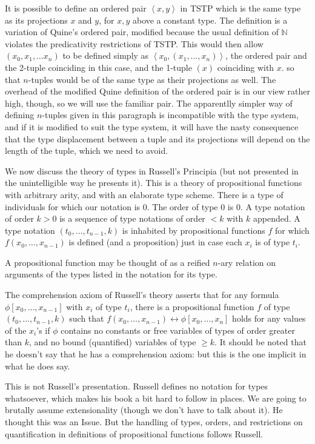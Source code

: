 \documentclass[12pt]{article}
\begin{document}
It is possible to define an ordered pair $\left<x,y\right>$ in TSTP which is the same type as its projections
$x$ and $y$, for $x,y$ above a constant type.  The definition is a variation of Quine's ordered pair, modified
because the usual definition of $\mathbb N$ violates the predicativity restrictions of TSTP.  This would then allow
$(x_0,x_1,\ldots x_n)$ to be defined simply as $\left<x_0,(x_1,\ldots,x_n)\right>$, the ordered pair and the 2-tuple coinciding in this case, and the 1-tuple $(x)$ coinciding with $x$. so that $n$-tuples would be of the same type as their projections as well.  The overhead of the modified Quine definition of the ordered pair is in our view rather high, though, so we will use the familiar pair.  The apparentlly simpler way of defining $n$-tuples given in this paragraph is
incompatible with the type system, and if it is modified to suit the type system, it will have the nasty consequence
that the type displacement between a tuple and its projections will depend on the length of the tuple, which we need to avoid.

We now discuss the theory of types in Russell's Principia (but not presented in the unintelligible way he presents it).  This is a theory of propositional functions with arbitrary arity, and with an elaborate type scheme.  There is a type of individuals for which our notation is 0.  The order of type 0 is 0.
A type notation of order $k>0$ is a sequence of type notations of order $<k$ with $k$ appended.  A type notation
$(t_0,\ldots,t_{n-1},k)$ is inhabited by propositional functions $f$ for which $f(x_0,\ldots,x_{n-1})$ is defined (and a proposition) just in case each $x_i$ is of type $t_i$. 

A propositional function may be thought of as a reified $n$-ary relation on arguments of the types listed in the notation for its type.

The comprehension axiom of Russell's theory asserts that for any formula $\phi[x_0,\ldots,x_{n-1}]$ with $x_i$ of type $t_i$, there is
a propositional function $f$ of type $(t_0,\ldots,t_{n-1},k)$ such that $f(x_0,\ldots,x_{n-1}) \leftrightarrow \phi[x_0,\ldots,x_n]$ holds for any values of the $x_i$'s if $\phi$ contains no constants or free variables of types of order
greater than $k$, and no bound (quantified) variables of type $\geq k$.  It should be noted that he doesn't say that he has a comprehension axiom:  but this is the one implicit in what he does say.

This is not Russell's presentation.  Russell defines no notation for types whatsoever, which makes his book a bit hard to follow in places.  We are going to brutally assume extensionality (though we don't have to talk about it).  He thought this was an Issue.  But the handling of types, orders, and restrictions on quantification in definitions of propositional functions follows Russell.
\end{document}
